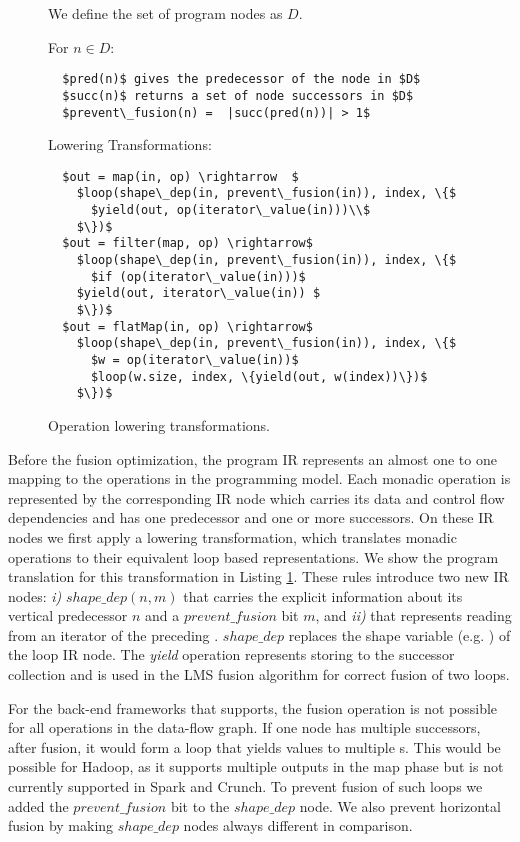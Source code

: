 \begin{figure}[t]
We define the set of program  nodes as $D$.

For $n \in D$:
\begin{lstlisting} 
  $pred(n)$ gives the predecessor of the node in $D$
  $succ(n)$ returns a set of node successors in $D$
  $prevent\_fusion(n) =  |succ(pred(n))| > 1$
\end{lstlisting}

Lowering Transformations:
\begin{lstlisting}
  $out = map(in, op) \rightarrow  $
    $loop(shape\_dep(in, prevent\_fusion(in)), index, \{$
      $yield(out, op(iterator\_value(in)))\\$
    $\})$
  $out = filter(map, op) \rightarrow$
    $loop(shape\_dep(in, prevent\_fusion(in)), index, \{$
      $if (op(iterator\_value(in)))$
	$yield(out, iterator\_value(in)) $
    $\})$
  $out = flatMap(in, op) \rightarrow$
    $loop(shape\_dep(in, prevent\_fusion(in)), index, \{$
      $w = op(iterator\_value(in))$
      $loop(w.size, index, \{yield(out, w(index))\})$
    $\})$
\end{lstlisting}
\caption{Operation lowering transformations.}
\label{lst:lowering}
\end{figure}

Before the fusion optimization, the program IR represents an almost one to one
mapping to the operations in the programming model. Each monadic operation is
represented by the corresponding IR node which carries its data and control flow
dependencies and has one predecessor and one or more successors. On these IR
nodes we first apply a lowering transformation, which translates monadic
operations to their equivalent loop based representations. We show the program
translation for this transformation in Listing \ref{lst:lowering}.
These rules introduce two new IR nodes: \emph{i)}
$shape\_dep(n, m)$ that carries the explicit information about its vertical
predecessor $n$ and a $prevent\_fusion$ bit $m$, and \emph{ii)}
 that represents reading from an iterator of the
preceding . $shape\_dep$ replaces the shape variable (e.g.
) of the loop IR node. The \emph{yield} operation represents
storing to the successor collection and is used in the LMS fusion algorithm for
correct fusion of two loops.

For the back-end frameworks that \tool supports, the fusion operation is not
possible for all operations in the data-flow graph. If one node has multiple
successors, after fusion, it would form a loop that yields values to multiple
s. This would be possible for Hadoop, as it supports multiple
outputs in the map phase but is not currently supported in Spark
and Crunch. To prevent fusion of such loops we added the $prevent\_fusion$ bit
to the $shape\_dep$ node. We also prevent horizontal fusion by making
$shape\_dep$ nodes always different in comparison.

